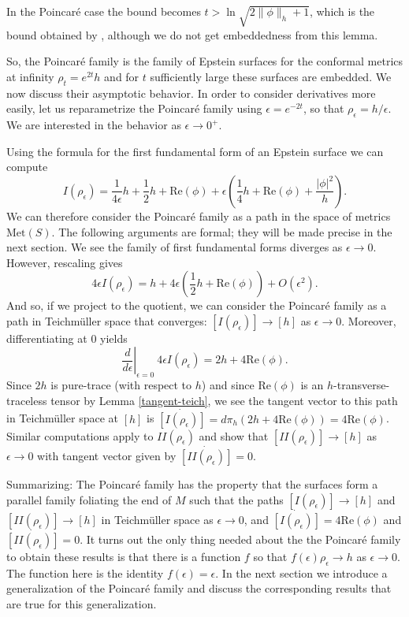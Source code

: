 \documentclass{amsart}
\newcommand{\two}{I\!\!I}
\begin{document}
In the Poincar\'e case the bound becomes $t > \ln \sqrt{2\|\phi\|_h + 1}$, which is the bound obtained by \cite{anderson} \cite{others?}, although we do not get embeddedness from this lemma. 

So, the Poincar\'e family is the family of Epstein surfaces for the conformal metrics at infinity $\rho_t = e^{2t}h$ and for $t$ sufficiently large these surfaces are embedded. 
We now discuss their asymptotic behavior. 
In order to consider derivatives more easily, let us reparametrize the Poincar\'e family using $\epsilon = e^{-2t}$, so that $\rho_\epsilon = h/\epsilon$. 
We are interested in the behavior as $\epsilon \to 0^+$. 

Using the formula for the first fundamental form of an Epstein surface we can compute
\[
I(\rho_\epsilon) = \frac{1}{4\epsilon} h + \frac{1}{2} h + \mathrm{Re}(\phi) + \epsilon \left( \frac{1}{4} h + \mathrm{Re}(\phi) + \frac{|\phi|^2}{h} \right).
\]
We can therefore consider the Poincar\'e family as a path in the space of metrics $\mathrm{Met}(S)$. 
The following arguments are formal; they will be made precise in the next section. 
We see the family of first fundamental forms diverges as $\epsilon \to 0$. 
However, rescaling gives
\[
4\epsilon I(\rho_\epsilon) = h + 4\epsilon \left( \frac{1}{2}h + \mathrm{Re}(\phi) \right) + O(\epsilon^2).
\]
And so, if we project to the quotient, we can consider the Poincar\'e family as a path in Teichm\"uller space that converges: $[I(\rho_\epsilon)] \to [h]$ as $\epsilon \to 0$. 
Moreover, differentiating at $0$ yields
\[
\left. \frac{d}{d\epsilon} \right|_{\epsilon = 0} \ 4\epsilon I(\rho_\epsilon) = 2h + 4 \mathrm{Re}(\phi).
\]
Since $2 h $ is pure-trace (with respect to $h$) and since $\mathrm{Re}(\phi)$ is an $h$-transverse-traceless tensor by Lemma \ref{tangent-teich}, we see the tangent vector to this path in Teichm\"uller space at $[h]$ is $\dot{[I(\rho_\epsilon)]} = d \pi_h (2h + 4 \mathrm{Re}(\phi)) = 4 \mathrm{Re}(\phi)$. Similar computations apply to $\two(\rho_\epsilon)$ and show that $[\two(\rho_\epsilon)] \to [h]$ as $\epsilon \to 0$ with tangent vector given by $\dot{[\two(\rho_\epsilon)]} = 0$. 

Summarizing: The Poincar\'e family has the property that the surfaces form a parallel family foliating the end of $M$ such that the paths $[I(\rho_\epsilon)] \to [h]$ and $[\two(\rho_\epsilon)] \to [h]$ in Teichm\"uller space as $\epsilon \to 0$, and $\dot{[I(\rho_\epsilon)]} = 4 \mathrm{Re}(\phi)$ and $\dot{[\two(\rho_\epsilon)]} = 0$. 
It turns out the only thing needed about the the Poincar\'e family to obtain these results is that there is a function $f$ so that $f(\epsilon)\rho_\epsilon \to h$ as $\epsilon \to 0$. 
The function here is the identity $f(\epsilon) = \epsilon$. 
In the next section we introduce a generalization of the Poincar\'e family and discuss the corresponding results that are true for this generalization.
\end{document}
